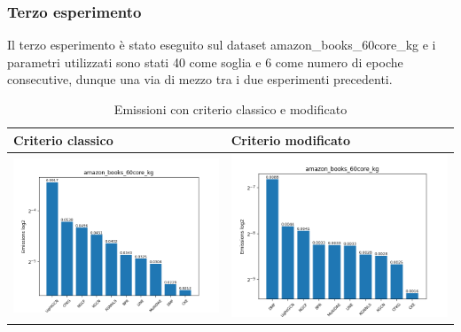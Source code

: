 \subsubsection{Terzo esperimento}


Il terzo esperimento è stato eseguito sul dataset amazon\_books\_60core\_kg e i parametri utilizzati sono stati 40 come soglia e 6 come numero di epoche consecutive, dunque una via di mezzo tra i due esperimenti precedenti.

\begin{table}[H]
    \centering
    \footnotesize
    \setlength\tabcolsep{0pt}
    \begin{tabularx}{\textwidth}{|X|X|}
        \hline
        \textbf{Criterio classico} & \textbf{Criterio modificato} \\
        \hline
        \includegraphics[width=\linewidth, trim=0 0 0 0]{images/emissions_amazon_books_60core_kg_earlyClassic.png} &
        \includegraphics[width=\linewidth, trim=0 0 0 0]{images/emissions_amazon_books_60core_kg_earlyModified.png} \\
        \hline
    \end{tabularx}
    \caption{Emissioni con criterio classico e modificato}
    \label{tab:emissions_info}
\end{table}



